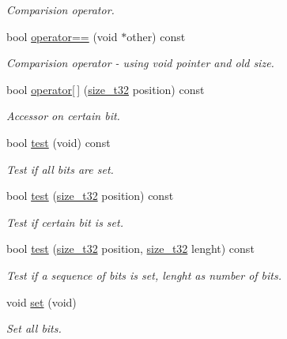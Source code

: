 \begin{DoxyCompactItemize}
\begin{DoxyCompactList}\small\item\em Comparision operator. \end{DoxyCompactList}\item 
bool \hyperlink{classcrap_1_1bit__mask_a170b6b81249745c6ea138bdfefec0579}{operator==} (void $\ast$other) const 
\begin{DoxyCompactList}\small\item\em Comparision operator -\/ using void pointer and old size. \end{DoxyCompactList}\item 
bool \hyperlink{classcrap_1_1bit__mask_a123922907c5a811b6c72839982f4a88d}{operator\mbox{[}$\,$\mbox{]}} (\hyperlink{types_8h_a38c0a12279ffe0fabec44939e753c914}{size\-\_\-t32} position) const 
\begin{DoxyCompactList}\small\item\em Accessor on certain bit. \end{DoxyCompactList}\item 
bool \hyperlink{classcrap_1_1bit__mask_afbe08785cec2fe70dec9fb81a485708c}{test} (void) const 
\begin{DoxyCompactList}\small\item\em Test if all bits are set. \end{DoxyCompactList}\item 
bool \hyperlink{classcrap_1_1bit__mask_a29f671c2e98e867c4afe0c08c8223ea4}{test} (\hyperlink{types_8h_a38c0a12279ffe0fabec44939e753c914}{size\-\_\-t32} position) const 
\begin{DoxyCompactList}\small\item\em Test if certain bit is set. \end{DoxyCompactList}\item 
bool \hyperlink{classcrap_1_1bit__mask_ad7562e10c60d4200f56f985667a3d8ff}{test} (\hyperlink{types_8h_a38c0a12279ffe0fabec44939e753c914}{size\-\_\-t32} position, \hyperlink{types_8h_a38c0a12279ffe0fabec44939e753c914}{size\-\_\-t32} lenght) const 
\begin{DoxyCompactList}\small\item\em Test if a sequence of bits is set, lenght as number of bits. \end{DoxyCompactList}\item 
void \hyperlink{classcrap_1_1bit__mask_aa76876c740b0dcff787e585132b50a50}{set} (void)
\begin{DoxyCompactList}\small\item\em Set all bits. \end{DoxyCompactList}\item 

\end{DoxyCompactItemize}
